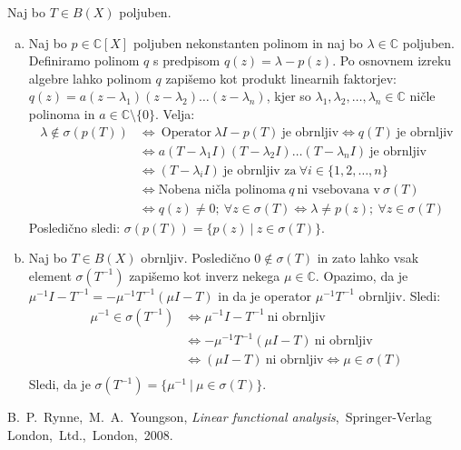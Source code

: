 \documentclass[mat2]{matdelo}
\newcommand{\C}{\mathbb{C}}
\begin{document}
		\begin{dokaz}
			Naj bo $T\in B(X)$ poljuben.
			\begin{enumerate}[a)]
				\item Naj bo $p\in\C[X]$ poljuben nekonstanten polinom in naj bo $\lambda\in\C$ poljuben. Definiramo polinom $q$ s predpisom $q(z) = \lambda - p(z)$. Po osnovnem izreku algebre lahko polinom $q$ zapišemo kot produkt linearnih faktorjev: $q(z) = a(z-\lambda_1)(z-\lambda_2)\ldots(z-\lambda_n)$, kjer so $\lambda_1, \lambda_2,\ldots, \lambda_n\in\C$ ničle polinoma in $a\in\C\setminus\{0\}$. Velja: \begin{align*}
					\lambda\notin \sigma(p(T)) &\iff~\text{Operator}~\lambda I - p(T)~\text{je obrnljiv} \iff q(T)~\text{je obrnljiv} \\
					&\iff a(T-\lambda_1 I)(T-\lambda_2 I)\ldots(T-\lambda_n I)~\text{je obrnljiv} \\
					&\iff (T-\lambda_i I)~\text{je obrnljiv za}~\forall i\in \{1, 2, \ldots, n\}\\
					&\iff \text{Nobena ničla polinoma}~q~\text{ni vsebovana v}~\sigma(T) \\
					&\iff q(z)\neq 0;~\forall z\in\sigma(T) \iff \lambda \neq p(z);~\forall z\in\sigma(T)
				\end{align*}
				Posledično sledi: $\sigma(p(T))=\{p(z)~|~z\in\sigma(T)\}$.
				\item Naj bo $T\in B(X)$ obrnljiv. Posledično $0\notin\sigma(T)$ in zato lahko vsak element $\sigma(T^{-1})$ zapišemo kot inverz nekega $\mu\in\C$. Opazimo, da je $\mu^{-1}I - T^{-1} = -\mu^{-1}T^{-1}(\mu I - T)$ in da je operator $\mu^{-1}T^{-1}$ obrnljiv. Sledi: \begin{align*}
					\mu^{-1}\in\sigma(T^{-1}) &\iff \mu^{-1}I - T^{-1}~\text{ni obrnljiv} \\
					&\iff -\mu^{-1}T^{-1}(\mu I - T)~\text{ni obrnljiv} \\
					&\iff (\mu I - T)~\text{ni obrnljiv} \iff \mu\in\sigma(T) \\
				\end{align*}
				Sledi, da je $\sigma(T^{-1})=\{\mu^{-1}~|~\mu\in\sigma(T)\}$.
			\end{enumerate}
		\end{dokaz}
		
	\begin{thebibliography}{99}
		 B.~P.~Rynne,~M.~A.~Youngson, \emph{Linear functional analysis},~Springer-Verlag London,~Ltd.,~London,~2008.
	\end{thebibliography}
	
\end{document}
